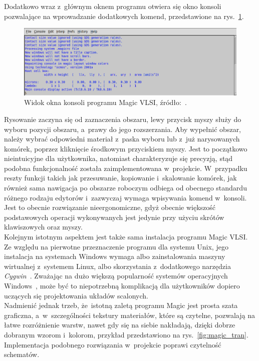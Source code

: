 \indent Dodatkowo wraz z~głównym oknem programu otwiera się okno konsoli pozwalające na wprowadzanie dodatkowych komend,
przedstawione na rys.~\ref{fig:magic_konsola}.

\begin{figure}[h]
    \centering
    \includegraphics[width=.9\textwidth]{chapters/chapter2/img/magic_okno_konsola}
    \caption[Widok okna konsoli programu Magic VLSI.]{Widok okna konsoli programu Magic VLSI, źródło:~\cite{MAGIC_site}.}
    \label{fig:magic_konsola}
\end{figure}

\indent Rysowanie zaczyna się od zaznaczenia obszaru, lewy przycisk myszy służy do wyboru pozycji obszaru,
a~prawy do jego rozszerzania.
Aby wypełnić obszar, należy wybrać odpowiedni materiał z~paska wyboru
lub z~już narysowanych komórek,
poprzez kliknięcie środkowym przyciskiem myszy.
Jest to początkowo nieintuicyjne dla użytkownika,
natomiast charakteryzuje się precyzją, stąd podobna funkcjonalność została zaimplementowana w~projekcie.
W~przypadku reszty funkcji takich jak przesuwanie, kopiowanie i~skalowanie komórek,
jak również sama nawigacja po obszarze roboczym odbiega od obecnego standardu różnego rodzaju edytorów
i~zazwyczaj wymaga wpisywania komend w~konsoli.
Jest to obecnie rozwiązanie nieergonomiczne, gdyż obecnie większość podstawowych operacji wykonywanych jest
jedynie przy użyciu skrótów klawiszowych oraz myszy.\\
\indent Kolejnym istotnym aspektem jest także sama instalacja programu Magic VLSI\@.
Ze względu na pierwotne przeznaczenie programu dla systemu Unix,
jego instalacja na systemach Windows wymaga albo zainstalowania maszyny wirtualnej z~systemem Linux,
albo skorzystania z~dodatkowego narzędzia \textit{Cygwin}~\cite{MAGIC_site,cygwin}.
Zważając na dużo większą popularność systemów operacyjnych Windows~\cite{os_stats},
może być to niepotrzebną komplikacją dla użytkowników dopiero uczących się projektowania układów scalonych.\\
\indent Nadmienić jednak trzeb, że~istotną zaletą programu Magic jest prosta szata graficzna,
a~w~szczególności tekstury materiałów, które są czytelne, pozwalają na łatwe rozróżnienie warstw,
nawet gdy się na siebie nakładają, dzięki dobrze dobranym wzorom i~kolorom,
przykład przedstawiono na rys.~\ref{fig:magic_tran}.
Implementacja podobnego rozwiązania w~projekcie poprawi czytelność schematów.

